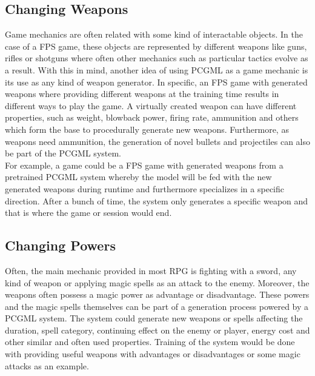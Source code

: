 \documentclass[MGS,Master,english]{twbook}%
\begin{document}
\subsection{Changing Weapons} \label{idea::changingWeapons}
Game mechanics are often related with some kind of interactable objects. In the case of a \ac{FPS} game, these objects are represented by different weapons like guns, rifles or shotguns where often other mechanics such as particular tactics evolve as a result. With this in mind, another idea of using PCGML as a game mechanic is its use as any kind of weapon generator. In specific, an FPS game with generated weapons where providing different weapons at the training time results in different ways to play the game. A virtually created weapon can have different properties, such as weight, blowback power, firing rate, ammunition and others which form the base to procedurally generate new weapons. Furthermore, as weapons need ammunition, the generation of novel bullets and projectiles can also be part of the PCGML system. \\
For example, a game could be a FPS game with generated weapons from a pretrained PCGML system whereby the model will be fed with the new generated weapons during runtime and furthermore specializes in a specific direction. After a bunch of time, the system only generates a specific weapon and that is where the game or session would end.

\subsection{Changing Powers} \label{idea::changingPowers}
Often, the main mechanic provided in most \ac{RPG} is fighting with a sword, any kind of weapon or applying magic spells as an attack to the enemy. Moreover, the weapons often possess a magic power as advantage or disadvantage. These powers and the magic spells themselves can be part of a generation process powered by a PCGML system. The system could generate new weapons or spells affecting the duration, spell category, continuing effect on the enemy or player, energy cost and other similar and often used properties. Training of the system would be done with providing useful weapons with advantages or disadvantages or some magic attacks as an example.
\end{document}

